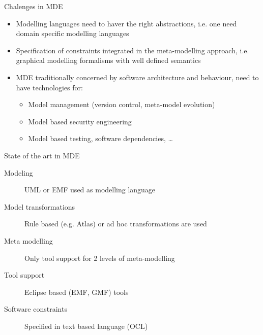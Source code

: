 \documentclass[slidetop,mathserif,red]{beamer}
\begin{document}
\begin{frame}{Chalenges in MDE}

    \begin{itemize}
    \item Modelling languages need to haver the right abstractions, i.e. one need domain specific modelling languages
    \item Specification of constraints integrated in the meta-modelling approach, i.e. graphical modelling formalisms with well defined semantics
    \item MDE traditionally concerned by software architecture and behaviour, need to have technologies for:
        \begin{itemize}
        \item Model management (version control, meta-model evolution)
        \item Model based security engineering
        \item Model based testing, software dependencies, \ldots
        \end{itemize}
    \end{itemize}
\end{frame}



\begin{frame}{State of the art in MDE}
  \begin{description}
  \item [Modeling] UML or EMF used as modelling language

  \item [Model transformations] Rule based (e.g. Atlas) or ad hoc transformations are used

  \item [Meta modelling] Only tool support for 2 levels of meta-modelling

  \item [Tool support] Eclipse based (EMF, GMF) tools

  \item [Software constraints] Specified in text based language (OCL)
  \end{description}
\end{frame}
\end{document}
